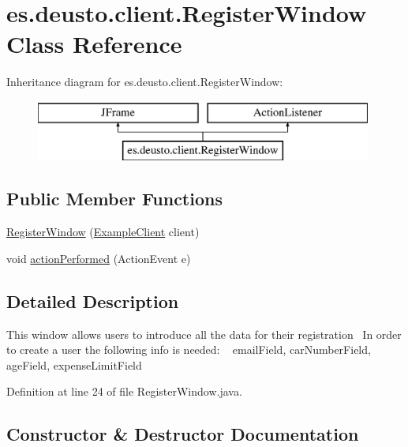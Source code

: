 \hypertarget{classes_1_1deusto_1_1client_1_1_register_window}{}\section{es.\+deusto.\+client.\+Register\+Window Class Reference}
\label{classes_1_1deusto_1_1client_1_1_register_window}
Inheritance diagram for es.\+deusto.\+client.\+Register\+Window\+:\begin{figure}[H]
\begin{center}
\leavevmode
\includegraphics[height=2.000000cm]{classes_1_1deusto_1_1client_1_1_register_window}
\end{center}
\end{figure}
\subsection*{Public Member Functions}
\begin{DoxyCompactItemize}
\item 
\hyperlink{classes_1_1deusto_1_1client_1_1_register_window_a366a6694a28782dd4af61379aff22b4e}{Register\+Window} (\hyperlink{classes_1_1deusto_1_1client_1_1_example_client}{Example\+Client} client)
\item 
void \hyperlink{classes_1_1deusto_1_1client_1_1_register_window_a0af8c49b9021ebd19adf9998dc121f58}{action\+Performed} (Action\+Event e)
\end{DoxyCompactItemize}


\subsection{Detailed Description}
This window allows users to introduce all the data for their registration~\newline
In order to create a user the following info is needed\+: ~\newline
email\+Field, car\+Number\+Field, age\+Field, expense\+Limit\+Field 

Definition at line 24 of file Register\+Window.\+java.



\subsection{Constructor \& Destructor Documentation}
\mbox{\label{classes_1_1deusto_1_1client_1_1_register_window_a366a6694a28782dd4af61379aff22b4e}} 
